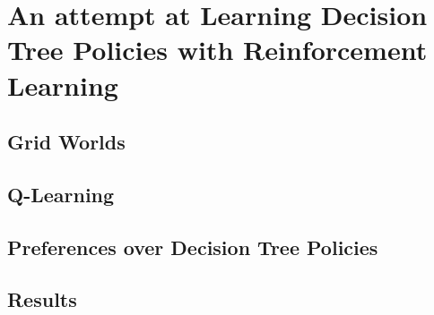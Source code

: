 \chapter{An attempt at Learning Decision Tree Policies with Reinforcement Learning}
\section{Grid Worlds}
\section{Q-Learning}
\section{Preferences over Decision Tree Policies}
\section{Results}